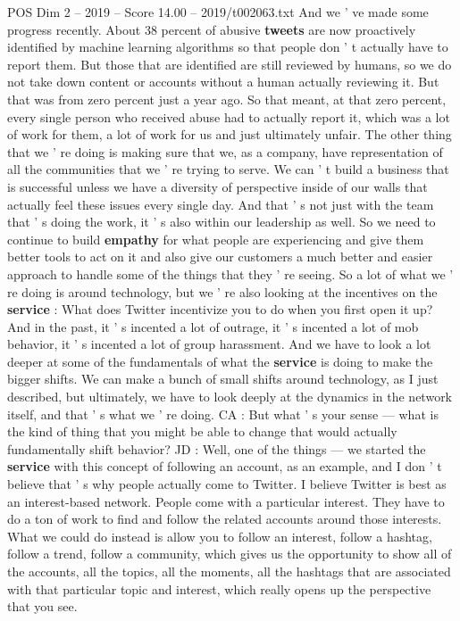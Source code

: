 \begin{textsample}{POS Dim 2 – 2019 – Score 14.00 – 2019/t002063.txt}
And we ' ve made some progress recently.
About 38 percent of abusive \textbf{tweets} are now proactively identified by machine learning algorithms so that people don ' t actually have to report them.
But those that are identified are still reviewed by humans, so we do not take down content or accounts without a human actually reviewing it.
But that was from zero percent just a year ago.
So that meant, at that zero percent, every single person who received abuse had to actually report it, which was a lot of work for them, a lot of work for us and just ultimately unfair.
The other thing that we ' re doing is making sure that we, as a company, have representation of all the communities that we ' re trying to serve.
We can ' t build a business that is successful unless we have a diversity of perspective inside of our walls that actually feel these issues every single day.
And that ' s not just with the team that ' s doing the work, it ' s also within our leadership as well.
So we need to continue to build \textbf{empathy} for what people are experiencing and give them better tools to act on it and also give our customers a much better and easier approach to handle some of the things that they ' re seeing.
So a lot of what we ' re doing is around technology, but we ' re also looking at the incentives on the \textbf{service} : What does Twitter incentivize you to do when you first open it up?
And in the past, it ' s incented a lot of outrage, it ' s incented a lot of mob behavior, it ' s incented a lot of group harassment.
And we have to look a lot deeper at some of the fundamentals of what the \textbf{service} is doing to make the bigger shifts.
We can make a bunch of small shifts around technology, as I just described, but ultimately, we have to look deeply at the dynamics in the network itself, and that ' s what we ' re doing.
CA : But what ' s your sense — what is the kind of thing that you might be able to change that would actually fundamentally shift behavior?
JD : Well, one of the things — we started the \textbf{service} with this concept of following an account, as an example, and I don ' t believe that ' s why people actually come to Twitter.
I believe Twitter is best as an interest-based network.
People come with a particular interest.
They have to do a ton of work to find and follow the related accounts around those interests.
What we could do instead is allow you to follow an interest, follow a hashtag, follow a trend, follow a community, which gives us the opportunity to show all of the accounts, all the topics, all the moments, all the hashtags that are associated with that particular topic and interest, which really opens up the perspective that you see.

\end{textsample}
